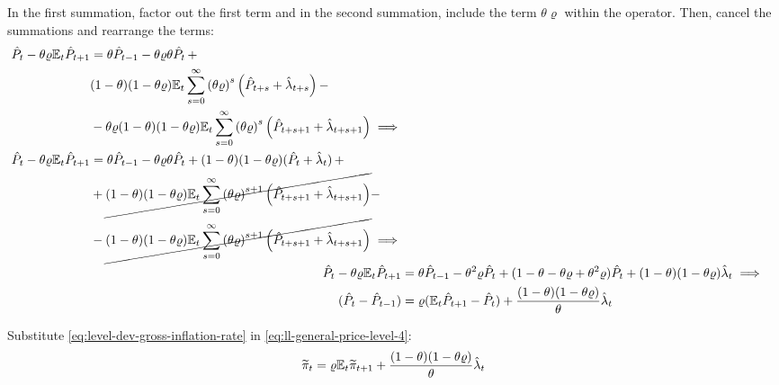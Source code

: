 \documentclass[
thesis.tex
]{subfiles}
\begin{document}
	In the first summation, factor out the first term and in the second summation, include the term $\theta \varrho$ within the operator. Then, cancel the summations and rearrange the terms:
	\begin{align}
		\begin{split}
			\hat{P}_t - \theta \varrho {\mathbb{E}_{t}} \hat{P}_{t+1} &= \theta \hat{P}_{t-1} - \theta \varrho \theta \hat{P}_t \, + \\
			& (1-\theta) (1- \theta \varrho) {\mathbb{E}_{t}} \sum_{s=0}^{\infty} \left( \theta \varrho \right)^s \left( \hat{P}_{t+s} + \hat{\lambda}_{t+s} \right) -
			\\
			& - \theta \varrho (1-\theta) (1- \theta \varrho) {\mathbb{E}_{t}} \sum_{s=0}^{\infty} \left( \theta \varrho \right)^s \left( \hat{P}_{t+s+1} + \hat{\lambda}_{t+s+1} \right) \implies \nonumber 
		\end{split} \\
		\begin{split}
			\hat{P}_t - \theta \varrho {\mathbb{E}_{t}} \hat{P}_{t+1} &= \theta \hat{P}_{t-1} - \theta \varrho \theta \hat{P}_t + (1-\theta) (1- \theta \varrho) (\hat{P}_t + \hat{\lambda}_t) \, + 
			\\
			& + \cancel{(1-\theta) (1- \theta \varrho) {\mathbb{E}_{t}} \sum_{s=0}^{\infty} \left( \theta \varrho \right)^{s+1} \left( \hat{P}_{t+s+1} + \hat{\lambda}_{t+s+1} \right)} -
			\\
			& - \cancel{(1-\theta) (1- \theta \varrho) {\mathbb{E}_{t}} \sum_{s=0}^{\infty} \left( \theta \varrho \right)^{s+1} \left( \hat{P}_{t+s+1} + \hat{\lambda}_{t+s+1} \right)} \implies \nonumber 
		\end{split} \\
		\hat{P}_t - \theta \varrho {\mathbb{E}_{t}} \hat{P}_{t+1} &= \theta \hat{P}_{t-1} - \theta^2 \varrho \hat{P}_t + (1- \theta -\theta \varrho + \theta^2 \varrho) \hat{P}_t + (1-\theta) (1- \theta \varrho) \hat{\lambda}_t \implies \nonumber \\
		(\hat{P}_t - \hat{P}_{t-1}) &= \varrho ({\mathbb{E}_{t}} \hat{P}_{t+1} - \hat{P}_t) + \frac{(1-\theta) (1- \theta \varrho)}{\theta} \hat{\lambda}_t
		\label{eq:ll-general-price-level-4}
	\end{align}
	
	Substitute \ref{eq:level-dev-gross-inflation-rate} in \ref{eq:ll-general-price-level-4}:
	\begin{align}
		\widetilde{\pi}_t = \varrho {\mathbb{E}_{t}} \widetilde{\pi}_{t+1} + \frac{(1-\theta) (1- \theta \varrho)}{\theta} \hat{\lambda}_t \label{eq:nk-phillips-curve-mc}
	\end{align}
	
\end{document}
